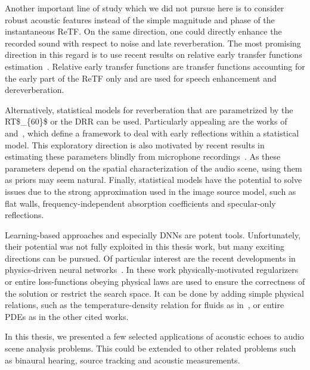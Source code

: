 \mynewline
Another important line of study which we did not pursue here is to consider robust acoustic features instead of the simple magnitude and phase of the instantaneous \ac{ReTF}.
On the same direction, one could directly enhance the recorded sound with respect to noise and late reverberation.
The most promising direction in this regard is to use recent results on relative early transfer functions estimation~.
Relative early transfer functions are transfer functions accounting for the early part of the \ac{ReTF} only and are used for speech enhancement and dereverberation.

\mynewline
Alternatively, statistical models for reverberation that are parametrized by the \ac{RT$_{60}$} or the \acf{DRR} can be used.
Particularly appealing are the works of~ and~, which define a framework to deal with early reflections within a statistical model.
This exploratory direction is also motivated by recent results in estimating these parameters blindly from microphone recordings~.
As these parameters depend on the spatial characterization of the audio scene, using them as priors may seem natural.
Finally, statistical models have the potential to solve issues due to the strong approximation used in the image source model, such as flat walls, frequency-independent absorption coefficients and specular-only reflections.

\mynewline
Learning-based approaches and especially \acfp{DNN} are potent tools.
Unfortunately, their potential was not fully exploited in this thesis work, but many exciting directions can be pursued.
Of particular interest are the recent developments in physics-driven neural networks~.
In these work physically-motivated regularizers or entire loss-functions obeying physical laws are used to ensure the correctness of the solution or restrict the search space.
It can be done by adding simple physical relations, such as the temperature-density relation for fluids as in~, or entire PDEs as in the other cited works.

In this thesis, we presented a few selected applications of acoustic echoes to audio scene analysis problems.
This could be extended to other related problems such as binaural hearing, source tracking and acoustic measurements.

